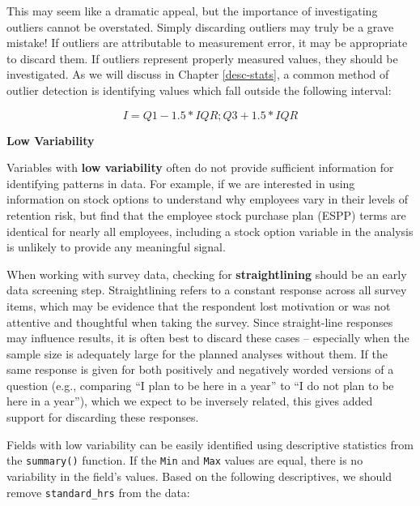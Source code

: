 \documentclass[
]{book}
\newenvironment{Shaded}{\begin{snugshade}}{\end{snugshade}}
\newcommand{\CommentTok}[1]{\textcolor[rgb]{0.56,0.35,0.01}{\textit{#1}}}
\newcommand{\FunctionTok}[1]{\textcolor[rgb]{0.00,0.00,0.00}{#1}}
\newcommand{\NormalTok}[1]{#1}
\newcommand{\SpecialCharTok}[1]{\textcolor[rgb]{0.00,0.00,0.00}{#1}}
\begin{document}
This may seem like a dramatic appeal, but the importance of investigating outliers cannot be overstated. Simply discarding outliers may truly be a grave mistake! If outliers are attributable to measurement error, it may be appropriate to discard them. If outliers represent properly measured values, they should be investigated. As we will discuss in Chapter \ref{desc-stats}, a common method of outlier detection is identifying values which fall outside the following interval:

\[I = Q1 - 1.5 * IQR; Q3 + 1.5 * IQR\]

\textbf{Low Variability}

Variables with \textbf{low variability} often do not provide sufficient information for identifying patterns in data. For example, if we are interested in using information on stock options to understand why employees vary in their levels of retention risk, but find that the employee stock purchase plan (ESPP) terms are identical for nearly all employees, including a stock option variable in the analysis is unlikely to provide any meaningful signal.

When working with survey data, checking for \textbf{straightlining} should be an early data screening step. Straightlining refers to a constant response across all survey items, which may be evidence that the respondent lost motivation or was not attentive and thoughtful when taking the survey. Since straight-line responses may influence results, it is often best to discard these cases -- especially when the sample size is adequately large for the planned analyses without them. If the same response is given for both positively and negatively worded versions of a question (e.g., comparing ``I plan to be here in a year'' to ``I do not plan to be here in a year''), which we expect to be inversely related, this gives added support for discarding these responses.

Fields with low variability can be easily identified using descriptive statistics from the \texttt{summary()} function. If the \texttt{Min} and \texttt{Max} values are equal, there is no variability in the field's values. Based on the following descriptives, we should remove \texttt{standard\_hrs} from the data:

\begin{Shaded}
\end{Shaded}
\end{document}
